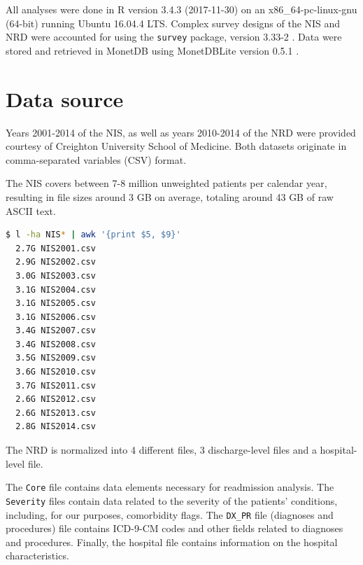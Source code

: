 \documentclass[12pt]{ociamthesis}\usepackage[]{graphicx}\usepackage[]{color}
\begin{document}
All analyses were done in R version 3.4.3 (2017-11-30) on an x86\_64-pc-linux-gnu (64-bit) 
running Ubuntu 16.04.4 LTS. 
Complex survey designs of the NIS and NRD  were accounted for using the \texttt{survey} package, version 
3.33-2 \cite{Lumley2018}. Data were stored and retrieved in
MonetDB using MonetDBLite version 0.5.1 \cite{Muehleisen2018}.

\section{Data source}

Years 2001-2014 of the NIS, as well as years 2010-2014 of the NRD were provided courtesy of Creighton University
School of Medicine. Both datasets originate in comma-separated variables (CSV) format. 

The NIS covers between 7-8 million unweighted patients per calendar year, resulting in file sizes around 3 GB on average,
totaling around 43 GB of raw ASCII text.

\begin{lstlisting}[language=Bash,caption={Showing file sizes for the NIS dataset from 2001-2014},captionpos=b]
  $ l -ha NIS* | awk '{print $5, $9}'
  2.7G NIS2001.csv                                                          
  2.9G NIS2002.csv                                                          
  3.0G NIS2003.csv                                                          
  3.1G NIS2004.csv                                                          
  3.1G NIS2005.csv                                                          
  3.1G NIS2006.csv                                                          
  3.4G NIS2007.csv                                                          
  3.4G NIS2008.csv                                                          
  3.5G NIS2009.csv
  3.6G NIS2010.csv
  3.7G NIS2011.csv
  2.6G NIS2012.csv
  2.6G NIS2013.csv
  2.8G NIS2014.csv
\end{lstlisting}

The NRD is normalized into 4 different files, 3 discharge-level files and a hospital-level file.

The \texttt{Core} file contains data elements necessary for readmission analysis. The \texttt{Severity} files
contain data related to the severity of the patients' conditions, including, for our purposes, comorbidity flags.
The \texttt{DX\_PR} file (diagnoses and procedures) file contains ICD-9-CM codes and other fields related to
diagnoses and procedures. Finally, the hospital file contains information on the hospital characteristics.
\end{document}
